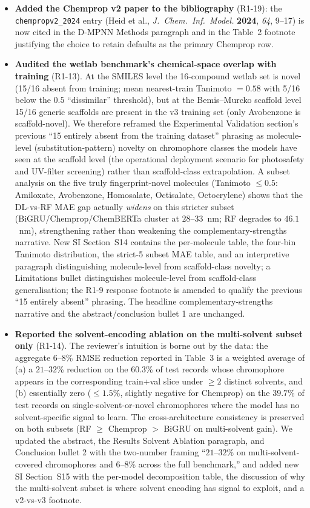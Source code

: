 \documentclass[11pt]{article}
\begin{document}
\begin{itemize}[leftmargin=2em]
  \item \textbf{Added the Chemprop v2 paper to the bibliography} (R1-19): the \texttt{chempropv2\_2024} entry (Heid et al., \textit{J.\ Chem.\ Inf.\ Model.} \textbf{2024}, \textit{64}, 9--17) is now cited in the D-MPNN Methods paragraph and in the Table~2 footnote justifying the choice to retain defaults as the primary Chemprop row.
 \item \textbf{Audited the wetlab benchmark's chemical-space overlap with training} (R1-13). At the SMILES level the 16-compound wetlab set is novel (15/16 absent from training; mean nearest-train Tanimoto $= 0.58$ with 5/16 below the $0.5$ ``dissimilar'' threshold), but at the Bemis--Murcko scaffold level 15/16 generic scaffolds are present in the v3 training set (only Avobenzone is scaffold-novel). We therefore reframed the Experimental Validation section's previous ``15 entirely absent from the training dataset'' phrasing as molecule-level (substitution-pattern) novelty on chromophore classes the models have seen at the scaffold level (the operational deployment scenario for photosafety and UV-filter screening) rather than scaffold-class extrapolation. A subset analysis on the five truly fingerprint-novel molecules (Tanimoto $\leq 0.5$: Amiloxate, Avobenzone, Homosalate, Octisalate, Octocrylene) shows that the DL-vs-RF MAE gap actually \emph{widens} on this stricter subset (BiGRU/Chemprop/ChemBERTa cluster at $28$--$33$~nm; RF degrades to $46.1$~nm), strengthening rather than weakening the complementary-strengths narrative. New SI Section~S14 contains the per-molecule table, the four-bin Tanimoto distribution, the strict-5 subset MAE table, and an interpretive paragraph distinguishing molecule-level from scaffold-class novelty; a Limitations bullet distinguishes molecule-level from scaffold-class generalisation; the R1-9 response footnote is amended to qualify the previous ``15 entirely absent'' phrasing. The headline complementary-strengths narrative and the abstract/conclusion bullet 1 are unchanged.
  \item \textbf{Reported the solvent-encoding ablation on the multi-solvent subset only} (R1-14). The reviewer's intuition is borne out by the data: the aggregate $6$--$8$\% RMSE reduction reported in Table~3 is a weighted average of (a) a $21$--$32$\% reduction on the $60.3$\% of test records whose chromophore appears in the corresponding train+val slice under $\geq 2$ distinct solvents, and (b) essentially zero ($\leq 1.5$\%, slightly negative for Chemprop) on the $39.7$\% of test records on single-solvent-or-novel chromophores where the model has no solvent-specific signal to learn. The cross-architecture consistency is preserved on both subsets (RF $\geq$ Chemprop $>$ BiGRU on multi-solvent gain). We updated the abstract, the Results Solvent Ablation paragraph, and Conclusion bullet 2 with the two-number framing ``$21$--$32$\% on multi-solvent-covered chromophores and $6$--$8$\% across the full benchmark,'' and added new SI Section~S15 with the per-model decomposition table, the discussion of why the multi-solvent subset is where solvent encoding has signal to exploit, and a v2-vs-v3 footnote.

\end{itemize}
\end{document}
